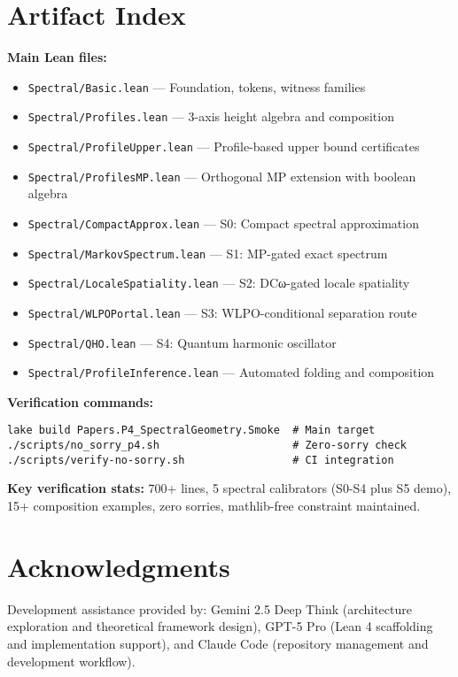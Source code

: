 \documentclass[11pt]{article}
\newcommand{\lean}[1]{\texttt{#1}}
\theoremstyle{plain}
\theoremstyle{definition}
\theoremstyle{remark}
\begin{document}
\appendix
\section{Artifact Index}

\textbf{Main Lean files:}
\begin{itemize}[noitemsep]
\item \lean{Spectral/Basic.lean} — Foundation, tokens, witness families
\item \lean{Spectral/Profiles.lean} — 3-axis height algebra and composition  
\item \lean{Spectral/ProfileUpper.lean} — Profile-based upper bound certificates
\item \lean{Spectral/ProfilesMP.lean} — Orthogonal MP extension with boolean algebra
\item \lean{Spectral/CompactApprox.lean} — S0: Compact spectral approximation
\item \lean{Spectral/MarkovSpectrum.lean} — S1: MP-gated exact spectrum
\item \lean{Spectral/LocaleSpatiality.lean} — S2: DCω-gated locale spatiality  
\item \lean{Spectral/WLPOPortal.lean} — S3: WLPO-conditional separation route
\item \lean{Spectral/QHO.lean} — S4: Quantum harmonic oscillator
\item \lean{Spectral/ProfileInference.lean} — Automated folding and composition
\end{itemize}

\textbf{Verification commands:}
\begin{verbatim}
lake build Papers.P4_SpectralGeometry.Smoke  # Main target
./scripts/no_sorry_p4.sh                     # Zero-sorry check
./scripts/verify-no-sorry.sh                 # CI integration
\end{verbatim}

\textbf{Key verification stats:} 700+ lines, 5 spectral calibrators (S0-S4 plus S5 demo), 15+ composition examples, zero sorries, mathlib-free constraint maintained.


\section*{Acknowledgments}
Development assistance provided by: Gemini 2.5 Deep Think (architecture exploration and theoretical framework design), GPT-5 Pro (Lean 4 scaffolding and implementation support), and Claude Code (repository management and development workflow).
\end{document}
